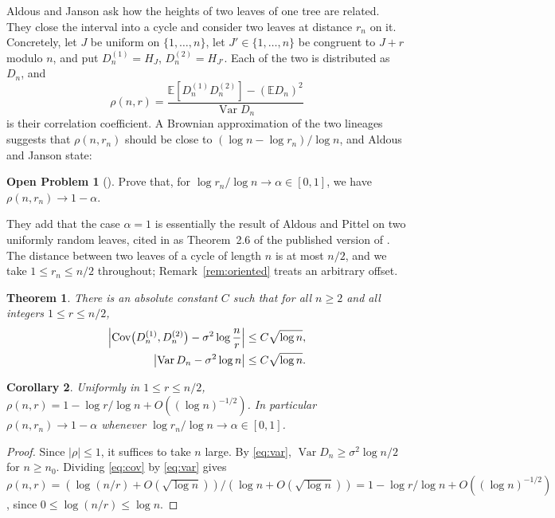 \documentclass[11pt]{amsart}
\newtheorem{theorem}{Theorem}[section]
\newtheorem{corollary}[theorem]{Corollary}
\theoremstyle{remark}
\numberwithin{equation}{section}
\newcommand{\E}{\mathbb E}
\newcommand{\Var}{\operatorname{Var}}
\newcommand{\Cov}{\operatorname{Cov}}
\begin{document}
Aldous and Janson \cite[Section~3.9]{AJ} ask how the heights of two leaves of one tree are related. They close the interval into a cycle and consider two leaves at distance $r_n$ on it. Concretely, let $J$ be uniform on $\{1,\dots,n\}$, let $J'\in\{1,\dots,n\}$ be congruent to $J+r$ modulo $n$, and put $D^{(1)}_n=H_J$, $D^{(2)}_n=H_{J'}$. Each of the two is distributed as $D_n$, and
\[
\rho(n,r)=\frac{\E[D^{(1)}_nD^{(2)}_n]-(\E D_n)^2}{\Var D_n}
\]
is their correlation coefficient. A Brownian approximation of the two lineages suggests that $\rho(n,r_n)$ should be close to $(\log n-\log r_n)/\log n$, and Aldous and Janson state:

\medskip\noindent\textbf{Open Problem 1} (\cite[Section~3.9]{AJ}). Prove that, for $\log r_n/\log n\to\alpha\in[0,1]$, we have $\rho(n,r_n)\to1-\alpha$.
\medskip

They add that the case $\alpha=1$ is essentially the result of Aldous and Pittel on two uniformly random leaves, cited in \cite{AJ} as Theorem~2.6 of the published version of \cite{AP}. The distance between two leaves of a cycle of length $n$ is at most $n/2$, and we take $1\le r_n\le n/2$ throughout; Remark~\ref{rem:oriented} treats an arbitrary offset.

\begin{theorem}\label{thm:main}
There is an absolute constant $C$ such that for all $n\ge2$ and all integers $1\le r\le n/2$,
\begin{align}
\Bigl|\Cov\bigl(D^{(1)}_n,D^{(2)}_n\bigr)-\sigma^2\log\frac nr\Bigr|&\le C\sqrt{\log n},\label{eq:cov}\\
\bigl|\Var D_n-\sigma^2\log n\bigr|&\le C\sqrt{\log n}.\label{eq:var}
\end{align}
\end{theorem}

\begin{corollary}\label{cor:rho}
Uniformly in $1\le r\le n/2$, $\rho(n,r)=1-\log r/\log n+O((\log n)^{-1/2})$. In particular $\rho(n,r_n)\to1-\alpha$ whenever $\log r_n/\log n\to\alpha\in[0,1]$.
\end{corollary}

\begin{proof}
Since $|\rho|\le1$, it suffices to take $n$ large. By \eqref{eq:var}, $\Var D_n\ge\sigma^2\log n/2$ for $n\ge n_0$. Dividing \eqref{eq:cov} by \eqref{eq:var} gives $\rho(n,r)=(\log(n/r)+O(\sqrt{\log n}))/(\log n+O(\sqrt{\log n}))=1-\log r/\log n+O((\log n)^{-1/2})$, since $0\le\log(n/r)\le\log n$.
\end{proof}
\end{document}
